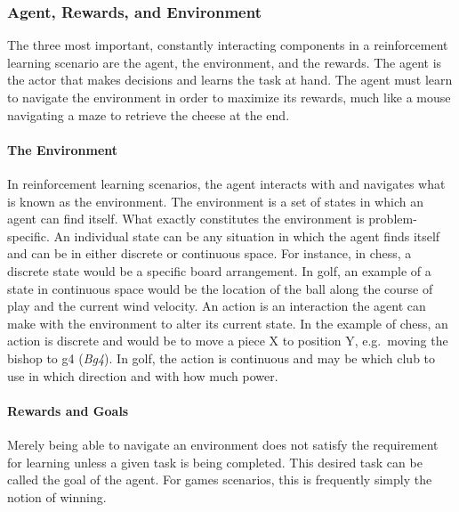 \subsubsection*{Agent, Rewards, and Environment}


The three most important, constantly interacting components in a reinforcement
learning scenario are
the agent, the environment, and the rewards.
%
The agent is the actor that makes decisions and learns the task at hand.
%
The agent must learn to navigate the environment in order to maximize its
rewards,
much like a mouse navigating a maze to retrieve the cheese at the end.

\paragraph*{The Environment}

In reinforcement learning scenarios,
the agent interacts with and navigates what is known as the environment.
%
The environment is a set of states in which an agent can find itself.
%
What exactly constitutes the environment is problem-specific.
%
An individual state can be any situation in which the agent finds itself
and can be in either discrete or continuous space.
%
For instance, in chess, a discrete state would be a specific board arrangement.
%
In golf, an example of a state in continuous space would be 
the location of the ball along the course of play
and the current wind velocity.
%
An action is an interaction the agent can make with the environment to alter
its current state.
%
In the example of chess,
an action is discrete and would be to move a piece X to position Y,
e.g.\  moving the bishop to g4 (\textit{Bg4}).
%
In golf, the action is continuous and may be
which club to use in which direction and with how much power.

\paragraph*{Rewards and Goals}

Merely being able to navigate an environment does not satisfy the
requirement for learning unless a given task is being completed.
%
This desired task can be called the goal of the agent.
%
For games scenarios,
this is frequently simply the notion of winning.

